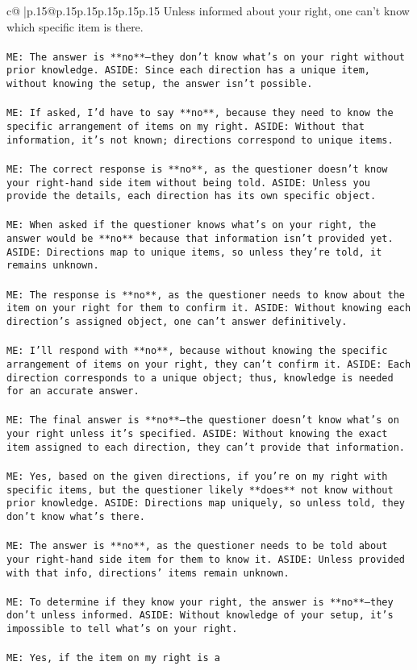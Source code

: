 \documentclass{article}
\begin{document}
{\begin{supertabular}{c@{$\;$}|p{.15\linewidth}@{}p{.15\linewidth}p{.15\linewidth}p{.15\linewidth}p{.15\linewidth}p{.15\linewidth}}
{{{Unless informed about your right, one can't know which specific item is there.\\ \tt \\ \tt ME: The answer is **no**—they don't know what's on your right without prior knowledge. ASIDE: Since each direction has a unique item, without knowing the setup, the answer isn't possible.\\ \tt \\ \tt ME: If asked, I'd have to say **no**, because they need to know the specific arrangement of items on my right. ASIDE: Without that information, it's not known; directions correspond to unique items.\\ \tt \\ \tt ME: The correct response is **no**, as the questioner doesn't know your right-hand side item without being told. ASIDE: Unless you provide the details, each direction has its own specific object.\\ \tt \\ \tt ME: When asked if the questioner knows what's on your right, the answer would be **no** because that information isn't provided yet. ASIDE: Directions map to unique items, so unless they're told, it remains unknown.\\ \tt \\ \tt ME: The response is **no**, as the questioner needs to know about the item on your right for them to confirm it. ASIDE: Without knowing each direction's assigned object, one can't answer definitively.\\ \tt \\ \tt ME: I'll respond with **no**, because without knowing the specific arrangement of items on your right, they can't confirm it. ASIDE: Each direction corresponds to a unique object; thus, knowledge is needed for an accurate answer.\\ \tt \\ \tt ME: The final answer is **no**—the questioner doesn't know what's on your right unless it's specified. ASIDE: Without knowing the exact item assigned to each direction, they can't provide that information.\\ \tt \\ \tt ME: Yes, based on the given directions, if you're on my right with specific items, but the questioner likely **does** not know without prior knowledge. ASIDE: Directions map uniquely, so unless told, they don't know what's there.\\ \tt \\ \tt ME: The answer is **no**, as the questioner needs to be told about your right-hand side item for them to know it. ASIDE: Unless provided with that info, directions' items remain unknown.\\ \tt \\ \tt ME: To determine if they know your right, the answer is **no**—they don't unless informed. ASIDE: Without knowledge of your setup, it's impossible to tell what's on your right.\\ \tt \\ \tt ME: Yes, if the item on my right is a }}}
\end{supertabular}}
\end{document}
